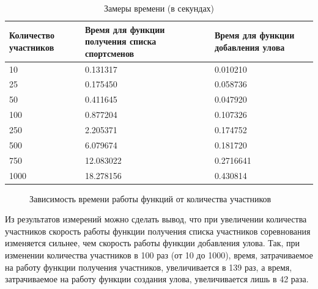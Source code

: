\begin{table}[Ht!]
	\centering
	\caption{Замеры времени (в секундах)}
	\label{time_measurements}
	\begin{tabular}{|p{4cm}|p{5cm}|p{5cm}|}
		\hline
		\textbf{Количество участников} & \textbf{Время для функции получения списка спортсменов} & \textbf{Время для функции добавления улова} \\
		\hline
		10 & 0.131317 & 0.010210 \\
		\hline
		25 & 0.175450 & 0.058736 \\
		\hline
		50 & 0.411645 & 0.047920 \\
		\hline
		100 & 0.877204 & 0.107326 \\
		\hline
		250 & 2.205371 & 0.174752 \\
		\hline
		500 & 6.079674 & 0.181720 \\
		\hline
		750 & 12.083022 & 0.2716641 \\
		\hline
		1000 & 18.278156 & 0.430814 \\
		\hline
	\end{tabular}
\end{table}

\begin{figure}[ht!]
	\caption{Зависимость времени работы функций от количества участников}
	\label{fig:plot}
\end{figure}

Из результатов измерений можно сделать вывод, что при увеличении количества участников скорость работы функции получения списка участников соревнования изменяется сильнее, чем скорость работы функции добавления улова. Так, при изменении количества участников в 100 раз (от 10 до 1000), время, затрачиваемое на работу функции получения участников, увеличивается в 139 раз, а время, затрачиваемое на работу функции создания улова, увеличивается лишь в 42 раза. 


